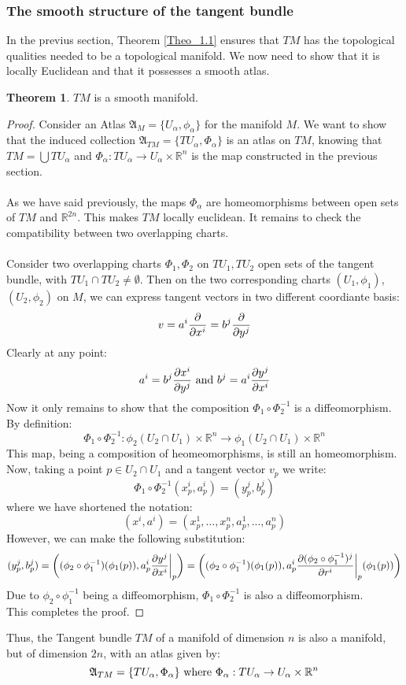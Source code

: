 \documentclass[12pt,a4paper]{report}
\theoremstyle{definition}
\theoremstyle{Theorem}
\newtheorem{Theo}[Def]{Theorem}
\theoremstyle{definition}
\theoremstyle{definition}
\begin{document}
		\subsubsection{The smooth structure of the tangent bundle}
		In the previus section, Theorem \ref{Theo_1.1} ensures that $TM$ has the topological qualities needed to be a topological manifold. We now need to show that it is locally Euclidean and that it possesses a smooth atlas.
		\begin{Theo}
			$TM$ is a smooth manifold.
		\end{Theo}
		\begin{proof}
			Consider an Atlas $\mathfrak{A}_M=\{U_\alpha,\phi_\alpha\}$ for the manifold $M$. We want to show that the induced collection $\mathfrak{A}_{TM}=\{TU_\alpha,\Phi_\alpha\}$ is an atlas on $TM$, knowing that $TM=\bigcup TU_\alpha$ and $\Phi_\alpha:TU_\alpha\rightarrow U_\alpha\times \mathbb{R}^n$ is the map constructed in the previous section.\\
			\\
			As we have said previously, the maps $\Phi_\alpha$ are homeomorphisms between open sets of $TM$ and $\mathbb{R}^{2n}$. This makes $TM$ locally euclidean. It remains to check the compatibility between two overlapping charts.\\
			\\
			Consider two overlapping charts $\Phi_1,\Phi_2$ on $TU_1,TU_2$ open sets of the tangent bundle, with $TU_1\cap TU_2\neq \emptyset$. Then on the two corresponding charts $(U_1,\phi_1)$, $(U_2,\phi_2)$ on $M$, we can express tangent vectors in two different coordiante basis:
			$$v=a^i{\partial\over \partial{x^i}}=b^j{\partial \over \partial y^j}$$
			Clearly at any point:
			$$a^i=b^j{\partial x^i\over\partial y^j} \hbox{ and } b^j=a^i{\partial y^j\over\partial x^i}$$
			Now it only remains to show that the composition $\Phi_1\circ \Phi_2^{-1}$ is a diffeomorphism.\\
			By definition:
			$$\Phi_1\circ \Phi_2^{-1}:\phi_2(U_2\cap U_1)\times \mathbb{R}^n\rightarrow \phi_1(U_2\cap U_1)\times \mathbb{R}^n$$
			This map, being a composition of heomeomorphisms, is still an homeomorphism. Now, taking a point $p\in U_2\cap U_1$ and a tangent vector $v_p$ we write:
			$$\Phi_1\circ \Phi_2^{-1}(x^i_p,a^i_p)=(y^j_p,b^j_p)$$
			where we have shortened the notation:
			$$(x^i,a^i)=(x^1_p,...,x^n_p,a^1_p,...,a^n_p)$$
			However, we can make the following substitution:
			$$(y^j_p,b^j_p)=\bigg((\phi_2\circ \phi_1^{-1})(\phi_1(p)),a^i_p{\partial y^j\over\partial x^i}\bigg|_p\bigg)=\bigg((\phi_2\circ \phi_1^{-1})(\phi_1(p)),a^i_p{\partial (\phi_2\circ \phi_1^{-1})^j\over\partial r^i}\bigg|_p(\phi_1(p))\bigg)$$
			Due to $\phi_2\circ \phi_1^{-1}$ being a diffeomorphism, $\Phi_1\circ \Phi_2^{-1}$ is also a diffeomorphism.\\
			This completes the proof.
		\end{proof}
		Thus, the Tangent bundle $TM$ of a manifold of dimension $n$ is also a manifold, but of dimension $2n$, with an atlas given by:
		$$\mathfrak{A}_{TM}=\{TU_\alpha,\Phi_\alpha\} \hbox{ where } \Phi_\alpha:TU_\alpha\rightarrow U_\alpha\times \mathbb{R}^n$$
\end{document}
